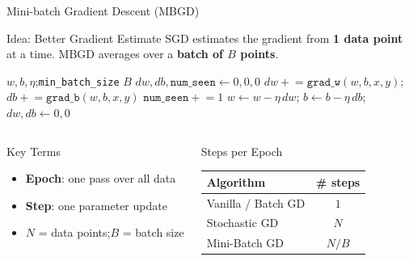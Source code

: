 \documentclass{beamer}
\begin{document}
\begin{frame}[shrink=10]{Mini-batch Gradient Descent (MBGD)}
  \begin{block}{Idea: Better Gradient Estimate}
    SGD estimates the gradient from \textbf{1 data point} at a time.
    MBGD averages over a \textbf{batch of $B$ points}.
  \end{block}

  \medskip

  \begin{algorithm}[H]
  \begin{algorithmic}[1]
    \REQUIRE $w,b,\eta$;\;\texttt{min\_batch\_size} $B$
      \STATE $dw,db,\texttt{num\_seen} \leftarrow 0,0,0$
        \STATE $dw \mathrel{+}= \texttt{grad\_w}(w,b,x,y)$;\;
               $db \mathrel{+}= \texttt{grad\_b}(w,b,x,y)$
        \STATE $\texttt{num\_seen} \mathrel{+}= 1$
          \STATE $w\leftarrow w-\eta\,dw$;\;
                 $b\leftarrow b-\eta\,db$;\;
                 $dw,db\leftarrow 0,0$
        \ENDIF
      \ENDFOR
    \ENDFOR
  \end{algorithmic}
  \caption{Mini-batch Gradient Descent}
  \end{algorithm}

  \medskip

  \begin{columns}[T]
    \begin{block}{Key Terms}
      \begin{itemize}\setlength\itemsep{4pt}
        \item \textbf{Epoch}: one pass over all data
        \item \textbf{Step}: one parameter update
        \item $N$ = data points;\quad $B$ = batch size
      \end{itemize}
    \end{block}

    \begin{block}{Steps per Epoch}
      \centering
      \renewcommand{\arraystretch}{1.3}
      \begin{tabular}{lc}
        \toprule
        \textbf{Algorithm} & \textbf{\# steps}\\
        \midrule
        Vanilla / Batch GD & $1$\\
        Stochastic GD      & $N$\\
        Mini-Batch GD      & $N/B$\\
        \bottomrule
      \end{tabular}
    \end{block}
  \end{columns}
\end{frame}
\end{document}

